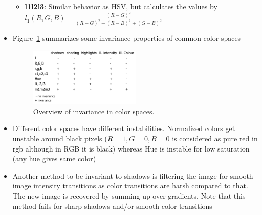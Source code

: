 \begin{itemize}
\begin{itemize}
		\item \textbf{l1l2l3}: Similar behavior as HSV, but calculates the values by $l_1(R,G,B) = \frac{(R-G)^2}{(R-G)^2 + (R-B)^2 + (G-B)^2}$
	\end{itemize}
	\item Figure~\ref{fig:cv_image_formation_invariance_color_spaces} summarizes some invariance properties of common color spaces
	\begin{figure}[ht!]
		\centering
		\includegraphics[width=0.5\textwidth]{figures/cv_image_formation_invariance_color_spaces.png}
		\caption{Overview of invariance in color spaces.}
		\label{fig:cv_image_formation_invariance_color_spaces}
	\end{figure}
	\item Different color spaces have different instabilities. Normalized colors get unstable around black pixels ($R=1, G=0, B=0$ is considered as pure red in rgb although in RGB it is black) whereas Hue is instable for low saturation (any hue gives same color)
	\item Another method to be invariant to shadows is filtering the image for smooth image intensity transitions as color transitions are harsh compared to that. The new image is recovered by summing up over gradients. Note that this method fails for sharp shadows and/or smooth color transitions
\end{itemize}